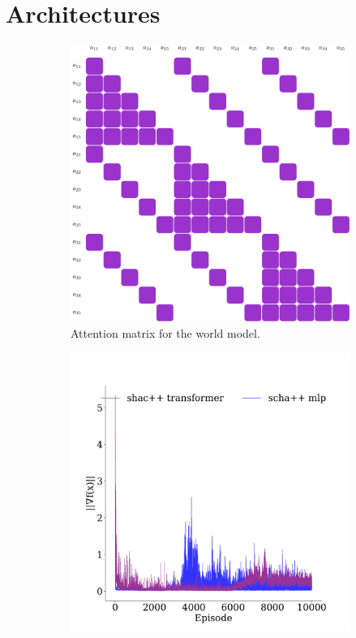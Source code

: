 



\section{Architectures}\label{apx:arch}


\begin{figure}[t]
    \centering
    \begin{subfigure}[b]{0.45\textwidth}
        \centering
        \includegraphics[width=\textwidth]{figs/attention.pdf}
        \caption{Attention matrix for the world model.}
        \label{apx:fig:attention}
    \end{subfigure}
    \hfill
    \begin{subfigure}[b]{0.45\textwidth}
        \centering
        \includegraphics[width=\textwidth]{figs/grads-mlp-transport.pdf}

\end{subfigure}
\end{figure}

